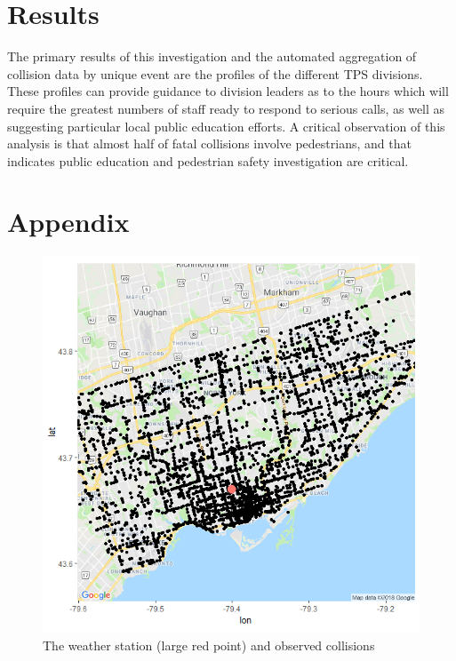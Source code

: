 \documentclass{article}
\begin{document}
\section{Results}

The primary results of this investigation and the automated aggregation of collision data by unique event are the profiles of the
different TPS divisions. These profiles can provide guidance to division leaders as to the hours which will require the
greatest numbers of staff ready to respond to serious calls, as well as suggesting particular local public education efforts. A critical
observation of this analysis is that almost half of fatal collisions involve pedestrians, and that indicates public education and
pedestrian safety investigation are critical.

\clearpage

\section{Appendix} \label{appendix}

\begin{figure}[!h]
	\begin{center}
		\includegraphics[scale=0.75]{WeatStat}
		\caption{The weather station (large red point) and observed collisions}
		\label{fig:weatherstation}
	\end{center}
\end{figure}
\end{document}
